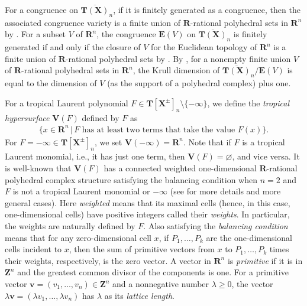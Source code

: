 \documentclass[a4paper,12pt]{amsart}
\begin{document}
For a congruence on $\overline{\boldsymbol{T}(\boldsymbol{X})}_n$, if it is finitely generated as a congruence, then the associated congruence variety is a finite union of $\boldsymbol{R}$-rational polyhedral sets in $\boldsymbol{R}^n$ by \cite[Corollary~3.5]{JuAe5}.
For a subset $V$ of $\boldsymbol{R}^n$, the congruence $\boldsymbol{E}(V)$ on $\overline{\boldsymbol{T}(\boldsymbol{X})}_n$ is finitely generated if and only if the closure of $V$ for the Euclidean topology of $\boldsymbol{R}^n$ is a finite union of $\boldsymbol{R}$-rational polyhedral sets by \cite[Theorem~1.1]{JuAe5}.
By \cite[Corollary~3.30]{JuAe=Nakajima}, for a nonempty finite union $V$ of $\boldsymbol{R}$-rational polyhedral sets in $\boldsymbol{R}^n$, the Krull dimension of $\overline{\boldsymbol{T}(\boldsymbol{X})}_n / \boldsymbol{E}(V)$ is equal to the dimension of $V$ (as the support of a polyhedral complex) plus one.

For a tropical Laurent polynomial $F \in \boldsymbol{T}[\boldsymbol{X}^{\pm}]_n \setminus \{ -\infty \}$, we define the \textit{tropical hypersurface} $\boldsymbol{V}(F)$ defined by $F$ as
\begin{align*}
\{ x \in \boldsymbol{R}^n \,|\, F \text{ has at least two terms that take the value } F(x) \}.
\end{align*}
For $F = -\infty \in \boldsymbol{T}[\boldsymbol{X}^{\pm}]_n$, we set $\boldsymbol{V}(-\infty) = \boldsymbol{R}^n$.
Note that if $F$ is a tropical Laurent monomial, i.e., it has just one term, then $\boldsymbol{V}(F) = \varnothing$, and vice versa.
It is well-known that $\boldsymbol{V}(F)$ has a connected weighted one-dimensional $\boldsymbol{R}$-rational polyhedral complex structure satisfying the balancing condition when $n = 2$ and $F$ is not a tropical Laurent monomial or $-\infty$ (see \cite[Proposition~3.1.6 and Theorem~3.3.5]{Maclagan=Sturmfels} for more details and more general cases).
Here \textit{weighted} means that its maximal cells (hence, in this case, one-dimensional cells) have positive integers called their \textit{weights}.
In particular, the weights are naturally defined by $F$.
Also satisfying the \textit{balancing condition} means that for any zero-dimensional cell $x$, if $P_1, \ldots, P_k$ are the one-dimensional cells incident to $x$, then the sum of primitive vectors from $x$ to $P_1, \ldots, P_k$ times their weights, respectively, is the zero vector.
A vector in $\boldsymbol{R}^n$ is \textit{primitive} if it is in $\boldsymbol{Z}^n$ and the greatest common divisor of the components is one.
For a primitive vector $\boldsymbol{v} = (v_1, \ldots, v_n) \in \boldsymbol{Z}^n$ and a nonnegative number $\lambda \ge 0$, the vector $\lambda \boldsymbol{v} = (\lambda v_1, \ldots, \lambda v_n)$ has $\lambda$ as its \textit{lattice length}.
\end{document}
